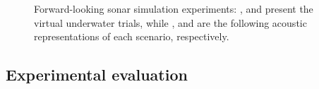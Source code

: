 \documentclass[final,5p,times]{elsarticle}
\begin{document}
\begin{figure}[!ht]
{        \label{fig:fls_sim2}
    }
    \setcounter{subfigure}{2}
    \setcounter{subfigure}{5}
    \captionsetup{justification=justified}
    \caption{Forward-looking sonar simulation experiments:
    ,  and 
    present the virtual underwater trials, while ,
     and  are the following acoustic
    representations of each scenario, respectively.}
    \label{fig:fls}
\end{figure}

\subsection{Experimental evaluation}
\end{document}

